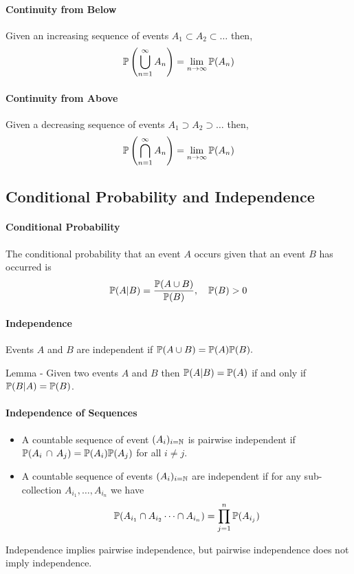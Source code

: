 \paragraph {Continuity from Below}
Given an increasing sequence of events \(A_1 \subset A_2 \subset \dots\) then, 
\[
    \mathbb{P}\left(
        \bigcup_{n=1}^{\infty} A_n
    \right)
    =
    \lim_{n\to\infty} \mathbb{P} (A_n)
\]

\paragraph {Continuity from Above}
Given a decreasing sequence of events \(A_1 \supset A_2 \supset \dots\) then, 
\[
    \mathbb{P}\left(
        \bigcap_{n=1}^{\infty} A_n
    \right)
    =
    \lim_{n\to\infty} \mathbb{P} (A_n)
\]

\subsection{Conditional Probability and Independence}
\paragraph{Conditional Probability}
The conditional probability that an event \(A\) occurs given that an event \(B\) has occurred is 
\[\mathbb{P}(A|B) = \frac{\mathbb{P}(A\cup B)}{\mathbb{P}(B)}, \quad \mathbb{P}(B) > 0\]

\paragraph{Independence}
Events \(A\) and \(B\) are independent if \(\mathbb{P}(A \cup B) = \mathbb{P}(A)\mathbb{P}(B).\)

Lemma - Given two events \(A\) and \(B\) then \(\mathbb{P}(A|B) = \mathbb{P}(A)\) if and only if \(\mathbb{P}(B|A) = \mathbb{P}(B)\).

\paragraph{Independence of Sequences}
\begin{itemize}
    \item A countable sequence of event \((A_i)_{i=\mathbb{N}}\) is pairwise independent if \(\mathbb{P}(A_i \, \cap \, A_j) = \mathbb{P}(A_i)\mathbb{P}(A_j)\) for all \(i \neq j\).
    \item A countable sequence of events \((A_i)_{i=\mathbb{N}}\) are independent if for any sub-collection \(A_{i_1}, \dots, A_{i_n}\) we have 
    \[\mathbb{P}(A_{i_1} \cap A_{i_2} \cdots \cap A_{i_n}) = \prod_{j=1}^n \mathbb{P}(A_{i_j})\]
\end{itemize}
Independence implies pairwise independence, but pairwise independence does not imply independence. 

